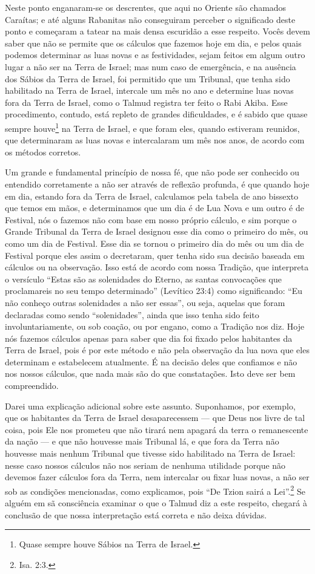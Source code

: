 Neste ponto enganaram-se os descrentes, que aqui no Oriente são chamados
Caraítas; e até alguns Rabanitas não conseguiram perceber o significado
deste ponto e começaram a tatear na mais densa escuridão a esse
respeito. Vocês devem saber que não se permite que os cálculos que
fazemos hoje em dia, e pelos quais podemos determinar as luas novas e as
festividades, sejam feitos em algum outro lugar a não ser na Terra de
Israel; mas num caso de emergência, e na ausência dos Sábios da Terra
de Israel, foi permitido que um Tribunal, que tenha sido habilitado na Terra de Israel, intercale um mês no ano
e determine luas novas fora da Terra de Israel, como o Talmud registra
ter feito o Rabi Akiba. Esse procedimento, contudo, está repleto de grandes
dificuldades, e é sabido que quase sempre houve\footnote{Quase sempre houve Sábios na Terra de Israel.} na Terra de
Israel, e que foram eles, quando estiveram reunidos, que determinaram as luas novas e intercalaram um mês nos anos, de acordo com os métodos corretos.

Um grande e fundamental princípio de nossa fé, que não pode ser
conhecido ou entendido corretamente a não ser através de reflexão
profunda, é que quando hoje em dia, estando fora da Terra de Israel,
calculamos pela tabela de ano bissexto que temos em mãos, e
determinamos que um dia é de Lua Nova e um outro é de Festival, nós o
fazemos não com base em nosso próprio cálculo, e sim porque o Grande
Tribunal da Terra de Israel designou esse dia como o primeiro do mês, ou
como um dia de Festival. Esse dia se tornou o primeiro dia do mês ou um
dia de Festival porque eles assim o decretaram, quer tenha sido sua
decisão baseada em cálculos ou na observação. Isso está de acordo com
nossa Tradição, que interpreta o versículo ``Estas são as solenidades do
Eterno, as santas convocações que proclamareis no seu tempo
determinado'' (Levítico 23:4) como significando: ``Eu não conheço outras
solenidades a não ser essas'', ou seja, aquelas que foram declaradas
como sendo ``solenidades'', ainda que isso tenha sido feito
involuntariamente, ou sob coação, ou por engano, como a Tradição nos
diz. Hoje nós fazemos cálculos apenas para saber que dia foi fixado
pelos habitantes da Terra de Israel, pois é por este método e não pela
observação da lua nova que eles determinam e estabelecem atualmente. É
na decisão deles que confiamos e não nos nossos cálculos, que nada mais
são do que constatações. Isto deve ser bem compreendido.

Darei uma explicação adicional sobre este assunto. Suponhamos, por
exemplo, que os habitantes da Terra de Israel desaparecessem --- que
Deus nos livre de tal coisa, pois Ele nos prometeu que não tirará nem
apagará da terra o remanescente da nação --- e que não houvesse mais
Tribunal lá, e que fora da Terra não houvesse mais nenhum Tribunal que
tivesse sido habilitado na Terra de Israel: nesse caso nossos cálculos
não nos seriam de nenhuma utilidade porque não devemos fazer cálculos fora da Terra, nem intercalar ou fixar luas novas, a não
ser sob as condições mencionadas, como explicamos, pois ``De Tzion sairá
a Lei''.\footnote{Isa. 2:3.} Se alguém em sã consciência examinar o
que o Talmud diz a este respeito, chegará à conclusão de que nossa
interpretação está correta e não deixa dúvidas.

